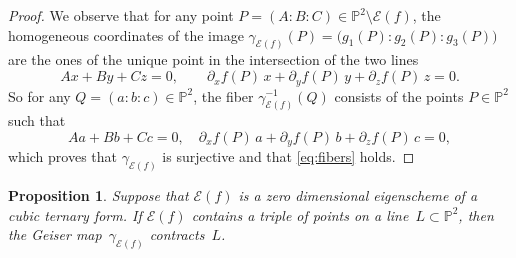 \documentclass{amsart}
\theoremstyle{plain}
\newtheorem{prop}[lemma]{Proposition}
\theoremstyle{definition}
\newcommand{\p}{\mathbb{P}}
\newcommand{\Bl}{\mathrm{Bl}}
\newcommand{\Eig}[1]{\mathcal{E}\!\left( {#1} \right)}
\begin{document}
\begin{proof}
We observe that for any point $P=(A:B:C) \in \p^2 \setminus \Eig{f}$, the homogeneous coordinates
of the image $\gamma_{\Eig{f}}(P) = \bigl( g_1(P): g_2(P): g_3(P) \bigr)$ are the ones of the unique point in the intersection of the two lines
%
\[
  Ax + By+ Cz  = 0, \qquad
  \partial_x f(P) \, x + \partial_y f(P) \, y+ \partial_z f(P) \, z = 0.
\]
%
So for any $Q = (a:b:c) \in \p^2$, the fiber $\gamma_{\Eig{f}}^{-1}(Q)$ consists of the points $P \in \p^2$ such that
%
\begin{equation}
\label{eq:polars}
Aa + Bb+ Cc = 0, \quad
\partial_x f(P) \, a + \partial_y f(P) \, b + \partial_z f(P) \, c = 0,
\end{equation}
%
which proves that $\gamma_{\Eig{f}}$ is surjective and that \eqref{eq:fibers} holds.
\end{proof}

\begin{prop}
\label{prop:allineati_contrae}
Suppose that $\Eig{f}$ is a zero dimensional eigenscheme of a cubic ternary form.
If $\Eig{f}$ contains a triple of points on a line~$L \subset \p^2$, then the Geiser map~$\gamma_{\Eig{f}}$ contracts~$L$.
\end{prop}
\end{document}
